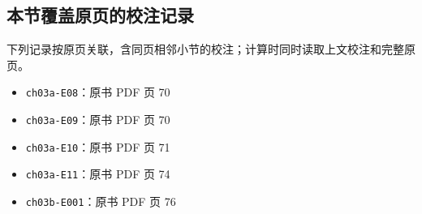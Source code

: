 \documentclass[
  10pt,
  fontset=fandol]{ctexart}
\providecommand{\tightlist}{%
  \setlength{\itemsep}{0pt}\setlength{\parskip}{0pt}}
\begin{document}
\subsection{本节覆盖原页的校注记录}\label{ux672cux8282ux8986ux76d6ux539fux9875ux7684ux6821ux6ce8ux8bb0ux5f55}

下列记录按原页关联，含同页相邻小节的校注；计算时同时读取上文校注和完整原页。

\begin{itemize}
\tightlist
\item
  \texttt{ch03a-E08}：原书 PDF 页 70
\item
  \texttt{ch03a-E09}：原书 PDF 页 70
\item
  \texttt{ch03a-E10}：原书 PDF 页 71
\item
  \texttt{ch03a-E11}：原书 PDF 页 74
\item
  \texttt{ch03b-E001}：原书 PDF 页 76
\end{itemize}
\end{document}
